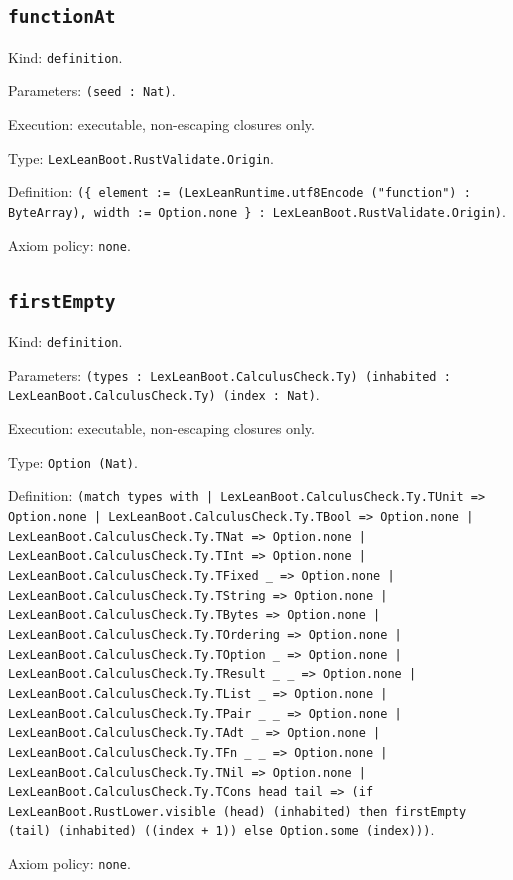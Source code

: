 \documentclass[11pt]{article}
\begin{document}
\subsection*{\texttt{functionAt}}
\noindent Kind: \texttt{definition}.\par
\noindent Parameters: \texttt{(seed : Nat)}.\par
\noindent Execution: executable, non-escaping closures only.\par
\noindent Type: \texttt{LexLeanBoot.RustValidate.Origin}.\par
\noindent Definition: \texttt{(\{ element := (LexLeanRuntime.utf8Encode ("function") : ByteArray), width := Option.none \} : LexLeanBoot.RustValidate.Origin)}.\par
\noindent Axiom policy: \texttt{none}.\par
\subsection*{\texttt{firstEmpty}}
\noindent Kind: \texttt{definition}.\par
\noindent Parameters: \texttt{(types : LexLeanBoot.CalculusCheck.Ty) (inhabited : LexLeanBoot.CalculusCheck.Ty) (index : Nat)}.\par
\noindent Execution: executable, non-escaping closures only.\par
\noindent Type: \texttt{Option (Nat)}.\par
\noindent Definition: \texttt{(match types with | LexLeanBoot.CalculusCheck.Ty.TUnit => Option.none | LexLeanBoot.CalculusCheck.Ty.TBool => Option.none | LexLeanBoot.CalculusCheck.Ty.TNat => Option.none | LexLeanBoot.CalculusCheck.Ty.TInt => Option.none | LexLeanBoot.CalculusCheck.Ty.TFixed \_ => Option.none | LexLeanBoot.CalculusCheck.Ty.TString => Option.none | LexLeanBoot.CalculusCheck.Ty.TBytes => Option.none | LexLeanBoot.CalculusCheck.Ty.TOrdering => Option.none | LexLeanBoot.CalculusCheck.Ty.TOption \_ => Option.none | LexLeanBoot.CalculusCheck.Ty.TResult \_ \_ => Option.none | LexLeanBoot.CalculusCheck.Ty.TList \_ => Option.none | LexLeanBoot.CalculusCheck.Ty.TPair \_ \_ => Option.none | LexLeanBoot.CalculusCheck.Ty.TAdt \_ => Option.none | LexLeanBoot.CalculusCheck.Ty.TFn \_ \_ => Option.none | LexLeanBoot.CalculusCheck.Ty.TNil => Option.none | LexLeanBoot.CalculusCheck.Ty.TCons head tail => (if LexLeanBoot.RustLower.visible (head) (inhabited) then firstEmpty (tail) (inhabited) ((index + 1)) else Option.some (index)))}.\par
\noindent Axiom policy: \texttt{none}.\par
\end{document}
